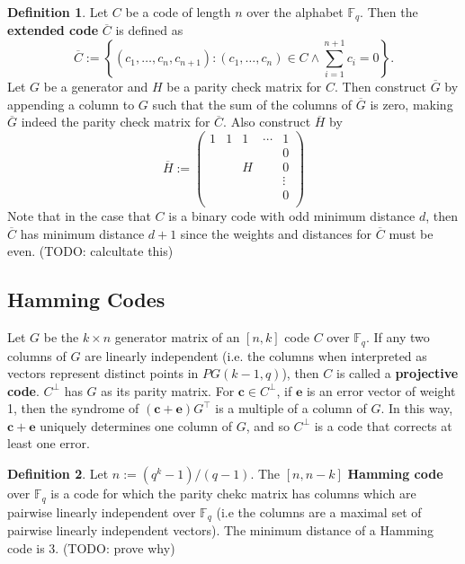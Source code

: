\documentclass{article}
\newcommand{\F}{\mathbb{F}}
\newcommand{\dual}[1]{#1^\bot}
\newcommand{\trans}[1]{#1^\top}
\newcommand{\ext}[1]{\overline{#1}}
\renewcommand{\=}{\equiv}
\newcommand{\set}[1]{\left\{ #1 \right\}}
\renewcommand{\v}{\mathbf}
\theoremstyle{plain}
\theoremstyle{definition}
\newtheorem{defn}{Definition}[subsection]
\newcommand{\TODO}[1]{(TODO: #1)}
\begin{document}
\begin{defn}
Let $C$ be a code of length $n$ over the alphabet $\F_q$.
Then the \textbf{extended code} $\ext{C}$ is defined as
$$ \ext{C} := \set{ (c_1, \dots, c_n, c_{n+1}) : (c_1, \dots, c_n) \in C \land \sum_{i=1}^{n+1} c_i = 0 }. $$
Let $G$ be a generator and $H$ be a parity check matrix for $C$.
Then construct $\ext{G}$ by appending a column to $G$ such that the sum of the columns of $\ext{G}$ is zero, making $\ext{G}$ indeed the parity check matrix for $\ext{C}$.
Also construct $\ext{H}$ by
\begin{equation}
  \ext{H} := \begin{pmatrix}
    1 & 1 & 1 & \cdots & 1 \\
      &   &   &       & 0 \\
      &   & H &       & 0 \\
      &   &   &       & \vdots \\
      &   &   &       & 0 \\
  \end{pmatrix}
\end{equation}
Note that in the case that $C$ is a binary code with odd minimum distance $d$, then $\ext{C}$ has minimum distance $d + 1$ since the weights and distances for $\ext{C}$ must be even.
\TODO{calcultate this}
\end{defn}

\subsection{Hamming Codes}

Let $G$ be the $k \times n$ generator matrix of an $[n,k]$ code $C$ over $\F_q$.
If any two columns of $G$ are linearly independent (i.e. the columns when interpreted as vectors represent distinct points in $PG(k-1, q)$), then $C$ is called a \textbf{projective code}.
$\dual C$ has $G$ as its parity matrix.
For $\v c \in \dual C$, if $\v e$ is an error vector of weight 1, then the syndrome of $(\v c + \v e) \trans G$ is a multiple of a column of $G$.
In this way, $\v c + \v e$ uniquely determines one column of $G$, and so $\dual C$ is a code that corrects at least one error.

\begin{defn}
Let $n := (q^k - 1)/(q - 1)$.
The $[n, n-k]$ \textbf{Hamming code} over $\F_q$ is a code for which the parity chekc matrix has columns which are pairwise linearly independent over $\F_q$ (i.e the columns are a maximal set of pairwise linearly independent vectors).
The minimum distance of a Hamming code is 3. \TODO{prove why}
\end{defn}
\end{document}
